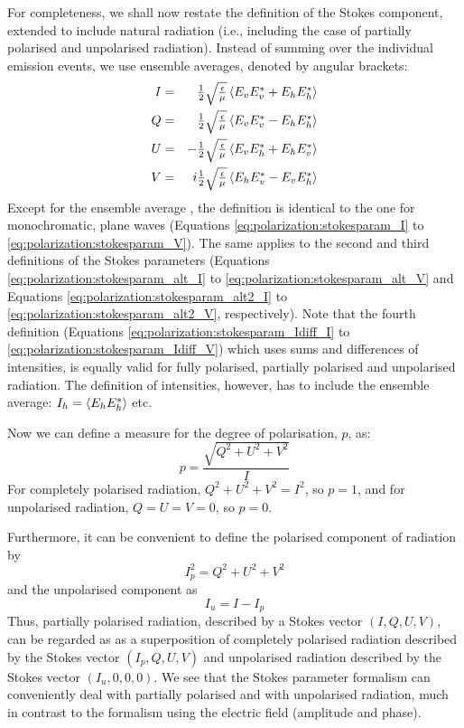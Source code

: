 For completeness, we shall now restate the definition of the Stokes
component, extended to include natural radiation (i.e., including the
case of partially polarised and unpolarised radiation).
Instead of summing over the individual emission events, we use
ensemble averages, denoted by angular brackets:
\begin{eqnarray}
  \label{eq:polarization:stokesparam_I_general}
  I &=& \half\InvImp  \EnsAvr{E_v E_v^\ast + E_h E_h^\ast} \\
  \label{eq:polarization:stokesparam_Q_general}
  Q &=&  \half\InvImp \EnsAvr{  E_v E_v^\ast - E_h E_h^\ast} \\
  \label{eq:polarization:stokesparam_U_general}
  U &=& - \half\InvImp \EnsAvr{  E_v E_h^\ast + E_h E_v^\ast} \\ %
  \label{eq:polarization:stokesparam_V_general}
  V &=& i \half\InvImp \EnsAvr{E_h E_v^\ast - E_v E_h^\ast}
\end{eqnarray}
Except for the ensemble average , the definition is identical to the
one for monochromatic, plane waves (Equations
\ref{eq:polarization:stokesparam_I} to \ref{eq:polarization:stokesparam_V}).
The same applies to the second and third definitions of the Stokes parameters
(Equations \ref{eq:polarization:stokesparam_alt_I} to
\ref{eq:polarization:stokesparam_alt_V} and Equations
\ref{eq:polarization:stokesparam_alt2_I} to
\ref{eq:polarization:stokesparam_alt2_V}, respectively). Note that the fourth
definition (Equations \ref{eq:polarization:stokesparam_Idiff_I} to
\ref{eq:polarization:stokesparam_Idiff_V}) which uses sums and differences of
intensities, is equally valid for fully polarised, partially polarised and
unpolarised radiation. The definition of intensities, however, has to include
the ensemble average: $I_h = \left\langle E_h E_h^\ast \right\rangle$ etc.

Now we can define a measure for
the degree of polarisation, $p$, as:
\begin{equation}
  \label{eq:polarization:pol_degree}
  p = \frac{\sqrt{Q^2 + U^2 + V^2}}{I}
\end{equation}
For completely polarised radiation, $Q^2 + U^2 + V^2 = I^2$, so $p =
1$, and for unpolarised radiation, $Q = U = V = 0$, so $p = 0$.

Furthermore, it can be convenient to define the polarised
component of radiation by
\begin{equation}
  \label{eq:polarization:pol_component}
  I_p^2 = Q^2 + U^2 + V^2
\end{equation}
and the unpolarised component as
\begin{equation}
  \label{eq:polarization:unpol_component}
  I_u = I - I_p
\end{equation}
Thus, partially polarised radiation, described by a Stokes vector $(I,
Q, U, V)$, can be regarded as as a superposition of completely
polarised radiation described by the Stokes vector $(I_p, Q, U, V)$
and unpolarised radiation described by the Stokes vector $(I_u,
0,0,0)$.  We see that the Stokes parameter formalism can conveniently
deal with partially polarised and with unpolarised radiation, much in
contrast to the formalism using the electric field (amplitude and
phase).

